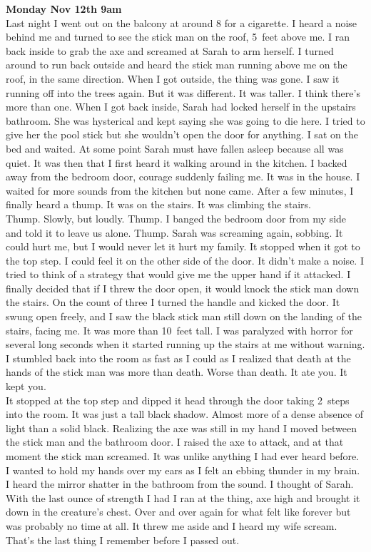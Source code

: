 \documentclass[a5paper]{scrartcl}
\begin{document}
\textbf{Monday Nov 12th  9am}
\\


Last night I went out on the balcony at around 8 for a cigarette. I heard a noise behind me and turned to see the stick man on the roof, 5~feet above me. I ran back inside to grab the axe and screamed at Sarah to arm herself. I turned around to run back outside and heard the stick man running above me on the roof, in the same direction. When I got outside, the thing was gone. I saw it running off into the trees again. But it was different. It was taller. I think there's more than one. 
When I got back inside, Sarah had locked herself in the upstairs bathroom. She was hysterical and kept saying she was going to die here. I tried to give her the pool stick but she wouldn't open the door for anything. I sat on the bed and waited. At some point Sarah must have fallen asleep because all was quiet. It was then that I first heard it walking around in the kitchen. I backed away from the bedroom door, courage suddenly failing me. It was in the house. I waited for more sounds from the kitchen but none came. After a few minutes, I finally heard a thump. It was on the stairs. It was climbing the stairs.\\


Thump. Slowly, but loudly. Thump. I banged the bedroom door from my side and told it to leave us alone. Thump. Sarah was screaming again, sobbing. It could hurt me, but I would never let it hurt my family. It stopped when it got to the top step. I could feel it on the other side of the door. It didn't make a noise. I tried to think of a strategy that would give me the upper hand if it attacked. I finally decided that if I threw the door open, it would knock the stick man down the stairs. On the count of three I turned the handle and kicked the door. It swung open freely, and I saw the black stick man still down on the landing of the stairs, facing me. It was more than 10~feet tall. I was paralyzed with horror for several long seconds when it started running up the stairs at me without warning. I stumbled back into the room as fast as I could as I realized that death at the hands of the stick man was more than death. Worse than death. It ate you. It kept you.\\


It stopped at the top step and dipped it head through the door taking 2~steps into the room. It was just a tall black shadow. Almost more of a dense absence of light than a solid black. Realizing the axe was still in my hand I moved between the stick man and the bathroom door. I raised the axe to attack, and at that moment the stick man screamed. It was unlike anything I had ever heard before. I wanted to hold my hands over my ears as I felt an ebbing thunder in my brain. I heard the mirror shatter in the bathroom from the sound. I thought of Sarah. With the last ounce of strength I had I ran at the thing, axe high and brought it down in the creature's chest. Over and over again for what felt like forever but was probably no time at all. It threw me aside and I heard my wife scream. That's the last thing I remember before I passed out. \\
\end{document}
